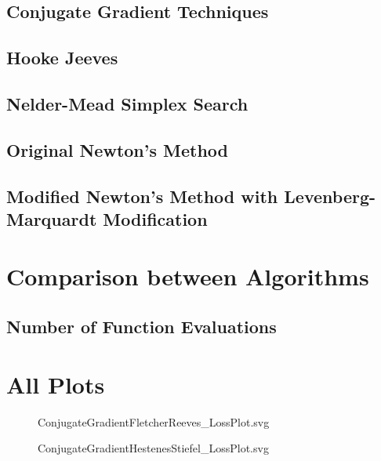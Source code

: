 \documentclass{article}
\begin{document}
    \subsection{Conjugate Gradient Techniques}

    \subsection{Hooke Jeeves}

    \subsection{Nelder-Mead Simplex Search}

    \subsection{Original Newton's Method}

    \subsection{Modified Newton's Method with Levenberg-Marquardt Modification}

    \section{Comparison between Algorithms}

    \subsection{Number of Function Evaluations}

    \appendix
    \section{All Plots}

    \begin{figure}[H]
        \centering
        
        \caption{ConjugateGradientFletcherReeves_LossPlot.svg}
        \label{fig:ConjugateGradientFletcherReeves_LossPlot.svg}
    \end{figure}
    
    \begin{figure}[H]
        \centering
        
        \caption{ConjugateGradientHestenesStiefel_LossPlot.svg}
        \label{fig:ConjugateGradientHestenesStiefel_LossPlot.svg}
    \end{figure}
    
\end{document}
